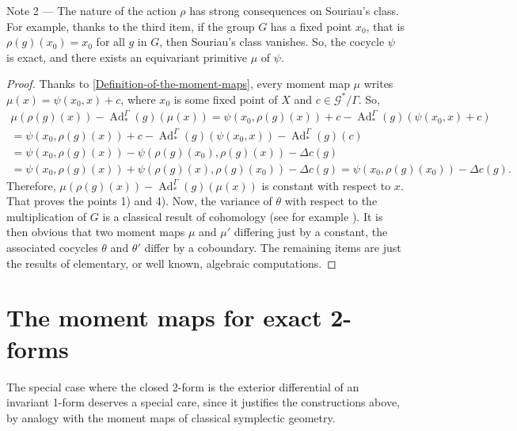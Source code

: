 \documentclass[10pt,reqno,twoside]{amsart}
\newcommand{\cG}{\mathcal{G}}
\DeclareMathOperator{\Ad}{Ad}
\theoremstyle{plain}
\theoremstyle{definition}
\begin{document}
  {\sc Note 2} --- The nature of the action $\rho$ has strong consequences on Souriau's class.
  For example,
  thanks to the third item,
  if the group $G$ has a fixed point $x_0$,
  that is $\rho(g)(x_0) = x_0$ for all $g$ in $G$,
  then Souriau's class vanishes.
  So,
  the cocycle $\psi$ is exact,
  and there exists an equivariant primitive $\mu$ of $\psi$.
  
  \begin{proof}
    Thanks to \ref{Definition-of-the-moment-maps},
    every moment map $\mu$ writes $\mu(x) = \psi(x_0,x) +c$,
    where $x_0$ is some fixed point of $X$ and $c \in \cG^*\!/\Gamma$.
    So,
    \begin{multline*}
      \mu(\rho(g)(x)) - \Ad_*^\Gamma(g)(\mu(x)) = \psi(x_0,\rho(g)(x)) + c - \Ad_*^\Gamma(g)(\psi(x_0,x) + c) \\
      = \psi(x_0,\rho(g)(x)) + c - \Ad_*^\Gamma(g)(\psi(x_0,x)) - \Ad_*^\Gamma(g)(c) \\
      = \psi(x_0,\rho(g)(x)) - \psi(\rho(g)(x_0),\rho(g)(x)) - \Delta c(g) \\
      = \psi(x_0,\rho(g)(x)) + \psi(\rho(g)(x),\rho(g)(x_0)) - \Delta c(g) = \psi(x_0,\rho(g)(x_0)) - \Delta c(g).
    \end{multline*}
    Therefore,
    $\mu(\rho(g)(x)) - \Ad_*^\Gamma(g)(\mu(x))$ is constant with respect to $x$.
    That proves the points 1) and 4).
    Now,
    the variance of $\theta$ with respect to the multiplication of $G$ is a classical result of cohomology (see for example \cite{Kir74}).
    It is then obvious that two moment maps $\mu$ and $\mu'$ differing just by a constant,
    the associated cocycles $\theta$ and $\theta'$ differ by a coboundary.
    The remaining items are just the results of elementary,
    or well known,
    algebraic computations.
  \end{proof}
  
  \section{The moment maps for exact 2-forms}
  
  The special case where the closed 2-form is the exterior differential of an invariant 1-form deserves a special care,
  since it justifies the constructions above,
  by analogy with the moment maps of classical symplectic geometry.
  
\end{document}

